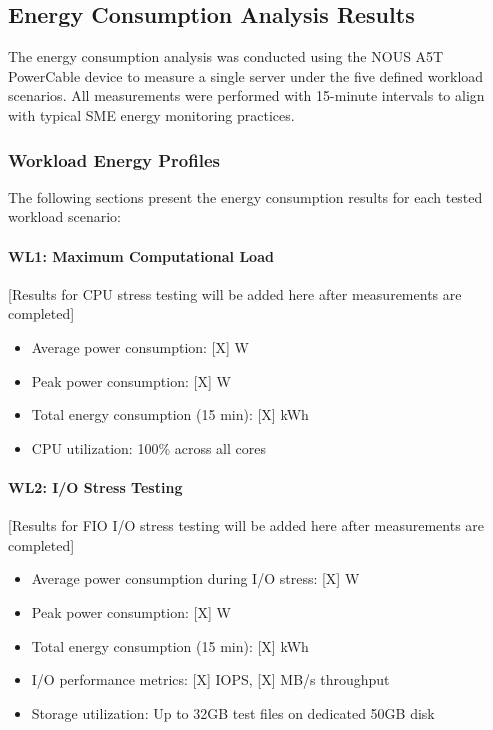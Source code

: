 \subsection{Energy Consumption Analysis Results}
\label{results:energy-consumption-analysis-results}
The energy consumption analysis was conducted using the NOUS A5T PowerCable device to 
measure a single server under the five defined workload scenarios. All measurements were 
performed with 15-minute intervals to align with typical SME energy monitoring practices.

\subsubsection{Workload Energy Profiles}
The following sections present the energy consumption results for each tested workload 
scenario:

\paragraph{WL1: Maximum Computational Load}
[Results for CPU stress testing will be added here after measurements are completed]
\begin{itemize}
    \item Average power consumption: [X] W
    \item Peak power consumption: [X] W  
    \item Total energy consumption (15 min): [X] kWh
    \item CPU utilization: 100\% across all cores
\end{itemize}

\paragraph{WL2: I/O Stress Testing}
[Results for FIO I/O stress testing will be added here after measurements are 
completed]

\begin{itemize}
    \item Average power consumption during I/O stress: [X] W
    \item Peak power consumption: [X] W
    \item Total energy consumption (15 min): [X] kWh
    \item I/O performance metrics: [X] IOPS, [X] MB/s throughput
    \item Storage utilization: Up to 32GB test files on dedicated 50GB disk
\end{itemize}

